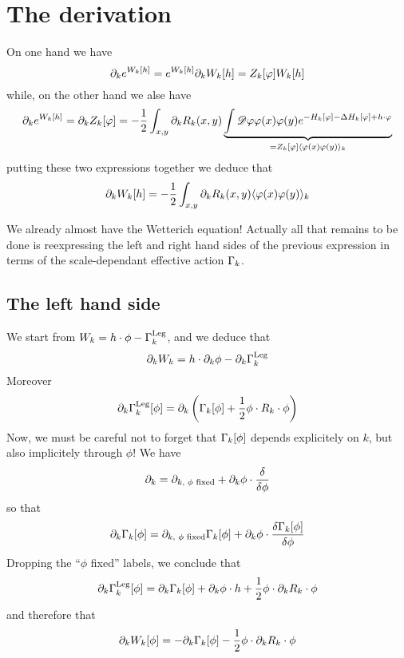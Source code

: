 \section{The derivation}
On one hand we have
\begin{equation}
\partial_{k} e^{W_k[h]} = e^{W_k[h]} \partial_{k} W_k[h] = Z_k[\varphi] W_k[h]
\end{equation}
while, on the other hand we alse have
\begin{equation}
\partial_{k} e^{W_k[h]} = \partial_{k} Z_k[\varphi] = - \frac{1}{2} \int_{x,y} \partial_{k} R_k(x,y) \underbrace{ \int  \mathscr{D}  \varphi \varphi(x) \varphi(y) e^{-H_k[\varphi] - \Delta H_k[\varphi] + h \cdot \varphi} }_{=Z_k[\varphi] \langle \varphi(x) \varphi(y) \rangle_k}
\end{equation}
putting these two expressions together we deduce that
\begin{equation}
\partial_{k} W_k[h] = -\frac{1}{2} \int_{x,y} \partial_{k} R_k(x,y) \langle \varphi(x) \varphi(y) \rangle_k
\end{equation}

We already almost have the Wetterich equation! Actually all that remains to be done is reexpressing the left and right hand sides of the previous expression in terms of the scale-dependant effective action $\Gamma_k$.

\subsection{The left hand side}
We start from $W_k = h \cdot \phi - \Gamma_k^{\text{Leg}} $, and we deduce that
\begin{equation}
\partial_{k} W_k = h \cdot \partial_{k} \phi - \partial_{k} \Gamma_k^{\text{Leg}}
\end{equation}
Moreover 
\begin{equation}
\partial_{k} \Gamma_k^{\text{Leg}}[\phi] = \partial_{k} \left( \Gamma_k[\phi] + \frac{1}{2} \phi \cdot R_k \cdot \phi \right) 
\end{equation}
Now, we must be careful not to forget that $\Gamma_k[\phi]$ depends explicitely on $k$, but also implicitely through $\phi$! We have
\begin{equation}
\partial_{k} = \partial_{k\text{, $\phi$ fixed}} + \partial_{k} \phi \cdot \frac{\delta}{\delta \phi}
\end{equation}
so that
\begin{equation}
\partial_{k} \Gamma_k[\phi] = \partial_{k\text{, $\phi$ fixed}} \Gamma_k[\phi] + \partial_k \phi \cdot \frac{\delta \Gamma_k[\phi]}{\delta \phi}
\end{equation}
Dropping the ``$\phi$ fixed'' labels, we conclude that
\begin{equation}
\partial_{k} \Gamma_k^{\text{Leg}}[\phi] = \partial_{k}\Gamma_k[\phi] + \partial_{k} \phi \cdot h + \frac{1}{2} \phi \cdot \partial_{k} R_k \cdot \phi
\end{equation}
and therefore that
\begin{equation}
\label{eq:lhs}
\partial_{k} W_k[\phi] = - \partial_{k} \Gamma_k[\phi] - \frac{1}{2}\phi \cdot \partial_{k} R_k \cdot \phi
\end{equation}

